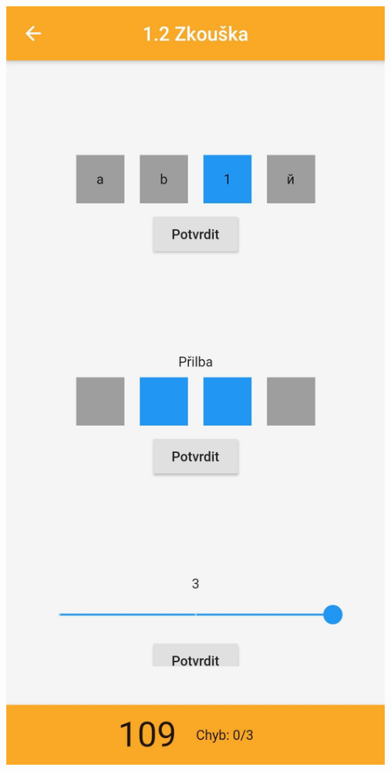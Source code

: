 \documentclass[czech,aspectratio=169]{beamer}
\begin{document}
\begin{frame}
\begin{columns}
\begin{column}{.25\textwidth}
\begin{center}
          \includegraphics[width=.9\textwidth]{assets/slides/screen-b3}
        \end{center}
      \end{column}
      \begin{column}{.25\textwidth}
        \begin{center}

\end{center}
\end{column}
\end{columns}
\end{frame}
\end{document}
